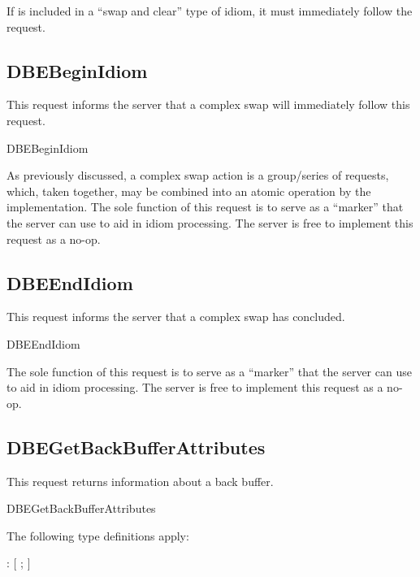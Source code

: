 If  is included in a ``swap and clear''
type of idiom, it must immediately follow the 
request.

\subsection{DBEBeginIdiom}

This request informs the server that a complex swap will immediately
follow this request.  

\begin{arequest}{DBEBeginIdiom}
\end{arequest}

As previously discussed, a complex swap action is a group/series of
requests, which, taken together, may be combined into an atomic
operation by the implementation.  The sole function of this request is
to serve as a ``marker'' that the server can use to aid in idiom
processing.  The server is free to implement this request as a no-op.

\subsection{DBEEndIdiom}

This request informs the server that a complex swap has concluded.  

\begin{arequest}{DBEEndIdiom}
\end{arequest}

The sole function of this request is to serve as a ``marker'' that the
server can use to aid in idiom processing.  The server is free to
implement this request as a no-op.


\subsection{DBEGetBackBufferAttributes}

This request returns information about a back buffer.

\begin{arequest}{DBEGetBackBufferAttributes}
\areply
{}
\end{arequest}

The following type definitions apply:

: [ ; ]

